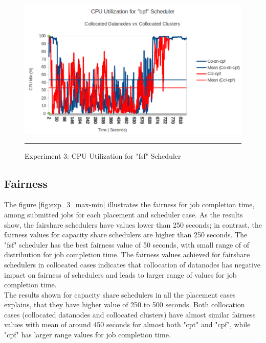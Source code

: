\begin{figure}[htbp]
  \centering
    \includegraphics[width=\textwidth,height=\textheight,keepaspectratio]{./Figures/exp3_cpu_fsf_dn_vs_ccl.pdf}
    \rule{35em}{0.5pt}
  \caption{Experiment 3: CPU‌ Utilization for "fsf" Scheduler}
  \label{fig:exp3_cpu_fsf}
\end{figure} 







 

\subsection{Fairness}
 The figure \ref{fig:exp_3_max-min} illustrates the fairness for job completion time, among submitted jobs for each placement and scheduler case. As the results show, the fairshare schedulers have  values  lower than 250 seconds; in contrast, the fairness values for capacity share schedulers are higher than 250 seconds. The "fsf" scheduler has the best fairness value of 50 seconds, with small range of of distribution for job completion time. The fairness values achieved for fairshare schedulers in collocated cases indicates that collocation of datanodes has negative impact on fairness of schedulers and leads to larger range of values for job completion time.\\ 
 
 The results shown for capacity share schedulers in all the placement cases explains, that they have higher value of 250 to 500 seconds. Both collocation cases (collocated datanodes and collocated clusters) have almost similar fairness values with mean of around 450 seconds for almost both "cpt" and "cpf", while "cpf" has larger range values for job completion time.  
 
